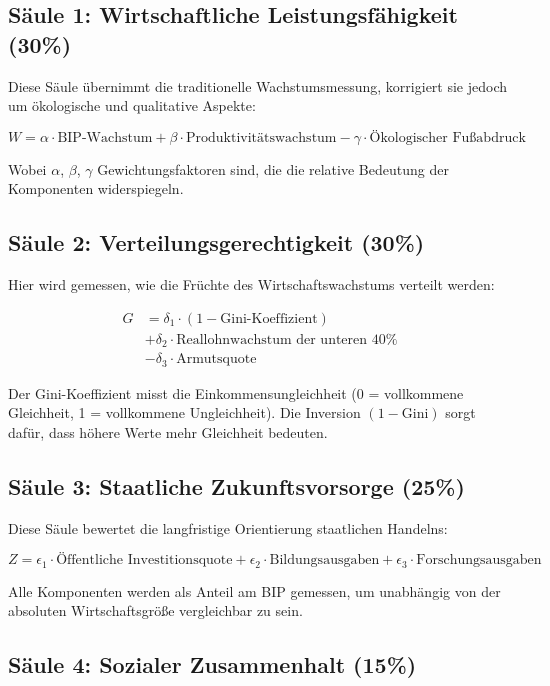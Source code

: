 \subsection{Säule 1: Wirtschaftliche Leistungsfähigkeit (30\%)}

Diese Säule übernimmt die traditionelle Wachstumsmessung, korrigiert sie jedoch um ökologische und qualitative Aspekte:

\[
W = \alpha \cdot \text{BIP-Wachstum} + \beta \cdot \text{Produktivitätswachstum} - \gamma \cdot \text{Ökologischer Fußabdruck}
\]

Wobei $\alpha$, $\beta$, $\gamma$ Gewichtungsfaktoren sind, die die relative Bedeutung der Komponenten widerspiegeln.

\subsection{Säule 2: Verteilungsgerechtigkeit (30\%)}

Hier wird gemessen, wie die Früchte des Wirtschaftswachstums verteilt werden:

\begin{align*}
G &= \delta_1 \cdot (1 - \text{Gini-Koeffizient}) \\
  &+ \delta_2 \cdot \text{Reallohnwachstum der unteren 40\%} \\
  &- \delta_3 \cdot \text{Armutsquote}
\end{align*}

Der Gini-Koeffizient misst die Einkommensungleichheit (0 = vollkommene Gleichheit, 1 = vollkommene Ungleichheit). Die Inversion $(1 - \text{Gini})$ sorgt dafür, dass höhere Werte mehr Gleichheit bedeuten.

\subsection{Säule 3: Staatliche Zukunftsvorsorge (25\%)}

Diese Säule bewertet die langfristige Orientierung staatlichen Handelns:

\[
Z = \epsilon_1 \cdot \text{Öffentliche Investitionsquote} + \epsilon_2 \cdot \text{Bildungsausgaben} + \epsilon_3 \cdot \text{Forschungsausgaben}
\]

Alle Komponenten werden als Anteil am BIP gemessen, um unabhängig von der absoluten Wirtschaftsgröße vergleichbar zu sein.

\subsection{Säule 4: Sozialer Zusammenhalt (15\%)}

